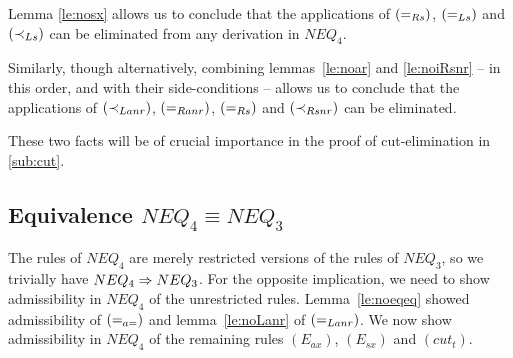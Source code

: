 \begin{REMARK}\label{re:crucial}
Lemma \ref{le:nosx} allows us to 
conclude that the applications of $(=_{Rs})$, $(=_{Ls})$ and $(\mathbin{\prec}_{Ls})$ can be
eliminated from any derivation in $NEQ_4$.

Similarly, though alternatively, combining lemmas~\ref{le:noar} and \ref{le:noiRsnr} 
-- in this order, and with their side-conditions -- allows us to conclude 
that the applications of $(\mathbin{\prec}_{Lanr})$, $(=_{Ranr})$, $(=_{Rs})$ and $(\mathbin{\prec}_{Rsnr})$ can be 
eliminated. 

These two facts will be of crucial importance in the proof of cut-elimination in
\ref{sub:cut}.
\end{REMARK}
%
\subsection{Equivalence $NEQ_{4}\equiv NEQ_{3}$}\label{sub:equiv}
The rules of $NEQ_{4}$ are merely restricted versions of the rules of 
$NEQ_{3}$, so we trivially have $NEQ_{4}\mathrel\Rightarrow NEQ_{3}$. For the 
opposite implication, we need to show admissibility in $NEQ_{4}$ of 
the unrestricted rules. Lemma~\ref{le:noeqeq} showed admissibility 
of $(=_{a=})$ and lemma~\ref{le:noLanr} of $(=_{Lanr})$. 
We now show admissibility in $NEQ_{4}$ of the remaining rules $(E_{ax})$, $(E_{sx})$ 
and $(cut_{t})$. %

